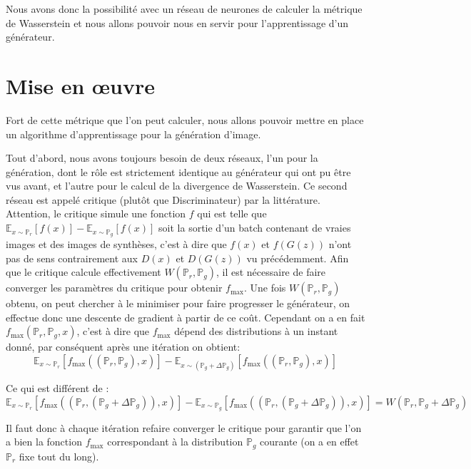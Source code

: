 Nous avons donc la possibilité avec un réseau de neurones de calculer la métrique de Wasserstein et nous allons pouvoir nous en servir pour l'apprentissage d'un générateur.

\section{Mise en œuvre}

Fort de cette métrique que l'on peut calculer, nous allons pouvoir mettre en place un algorithme d'apprentissage pour la génération d'image.

Tout d'abord, nous avons toujours besoin de deux réseaux, l'un pour la génération, dont le rôle est strictement identique au générateur qui ont pu être vus avant, et l'autre pour le calcul de la divergence de Wasserstein. Ce second réseau est appelé critique (plutôt que Discriminateur) par la littérature. Attention, le critique simule une fonction $f$ qui est telle que $\mathbb{E}_{x\sim\mathbb{P}_r}[f(x)] - \mathbb{E}_{x\sim\mathbb{P}_g}[f(x)] $ soit la sortie d'un batch contenant de vraies images et des images de synthèses, c'est à dire que $f(x)$ et $f(G(z))$ n'ont pas de sens contrairement aux $D(x)$ et $D(G(z))$ vu précédemment. 
Afin que le critique calcule effectivement $W(\mathbb{P}_r, \mathbb{P}_g)$, il est nécessaire de faire converger les paramètres du critique pour obtenir $f_{\text{max}}$. Une fois $W(\mathbb{P}_r, \mathbb{P}_g)$ obtenu, on peut chercher à le minimiser pour faire progresser le générateur, on effectue donc une descente de gradient à partir de ce coût. Cependant on a en fait $f_{\text{max}}(\mathbb{P}_r, \mathbb{P}_g, x)$, c'est à dire que $f_{\text{max}}$ dépend des distributions à un instant donné, par conséquent après une itération on obtient:
 \[\mathbb{E}_{x\sim\mathbb{P}_r}[f_\text{max}((\mathbb{P}_r, \mathbb{P}_g), x)] - \mathbb{E}_{x\sim\left(\mathbb{P}_g+\Delta\mathbb{P}_g\right)}[f_\text{max}((\mathbb{P}_r, \mathbb{P}_g), x)] \]

Ce qui est différent de :
 \[ \mathbb{E}_{x\sim\mathbb{P}_r}[f_\text{max}((\mathbb{P}_r, \left(\mathbb{P}_g+\Delta\mathbb{P}_g\right)), x)] - \mathbb{E}_{x\sim \mathbb{P}_g}[f_\text{max}((\mathbb{P}_r, \left(\mathbb{P}_g+\Delta\mathbb{P}_g\right)), x)] = W(\mathbb{P}_r, \mathbb{P}_g+\Delta\mathbb{P}_g)\]

 Il faut donc à chaque itération refaire converger le critique pour garantir que l'on a bien la fonction $f_{\text{max}}$ correspondant à la distribution $\mathbb{P}_g$ courante (on a en effet $\mathbb{P}_r$ fixe tout du long).

